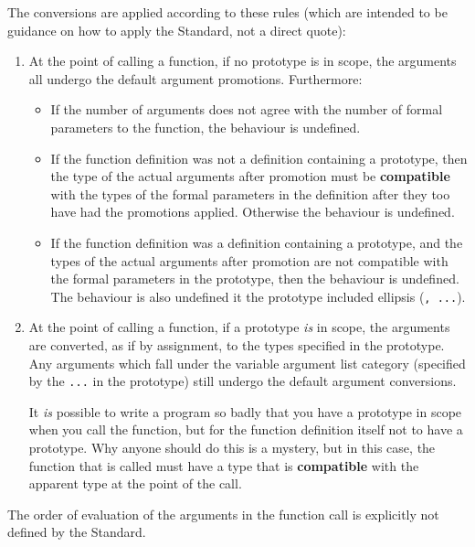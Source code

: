    The conversions are applied according to these rules (which are
    intended to be guidance on how to apply the Standard, not a direct
    quote):


   \begin{enumerate}
    \item At the point of calling a function, if no prototype is in scope,
     the arguments all undergo the default argument promotions.
     Furthermore:
     \begin{itemize}
      \item If the number of arguments does not agree with the number of
       formal parameters to the function, the behaviour is undefined.
      \item If the function definition was not a definition containing a
       prototype, then the type of the actual arguments after promotion must
       be \textbf{compatible} with the types of the formal parameters in
       the definition after they too have had the promotions applied.
       Otherwise the behaviour is undefined.
      \item If the function definition was a definition containing a
       prototype, and the types of the actual arguments after promotion are
       not compatible with the formal parameters in the prototype, then the
       behaviour is undefined. The behaviour is also undefined it the
       prototype included ellipsis (\texttt{, ...}).
     \end{itemize}
    
    \item 
     At the point of calling a function, if a prototype \textit{is} in
      scope, the arguments are converted, as if by assignment, to the types
      specified in the prototype. Any arguments which fall under the
      variable argument list category (specified by
      the \texttt{...} in the prototype) still undergo the default
      argument conversions.

     It \textit{is} possible to write a program so badly that you have a
      prototype in scope when you call the function, but for the function
      definition itself not to have a prototype. Why anyone should do this
      is a mystery, but in this case, the function that is called must have
      a type that is \textbf{compatible} with the apparent type at the
      point of the call.

    
   \end{enumerate}

   The order of evaluation of the arguments in the function call is
    explicitly not defined by the Standard.


